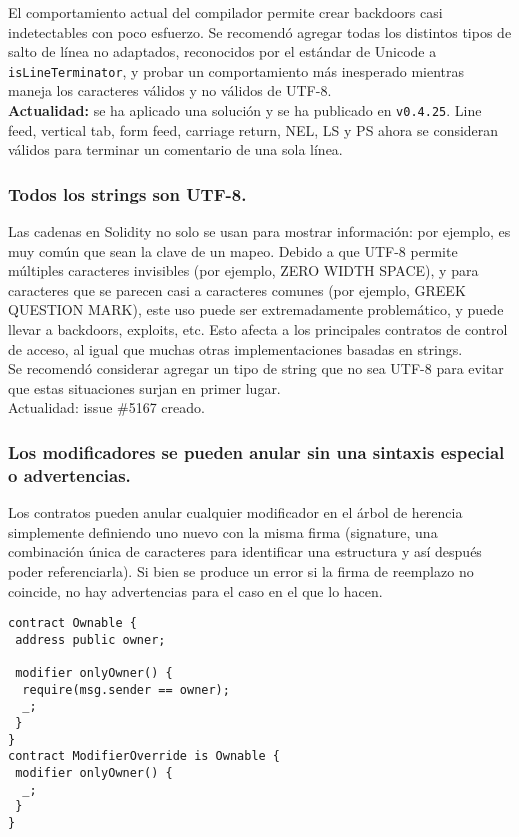 El comportamiento actual del compilador permite crear backdoors casi indetectables con poco esfuerzo. Se recomendó agregar todas los distintos tipos de salto de línea no adaptados, reconocidos por el estándar de Unicode\cite{UnicodeLineBreaking} a \verb|isLineTerminator|, y probar un comportamiento más inesperado mientras maneja los caracteres válidos y no válidos de UTF-8.\\

\textbf{Actualidad:} se ha aplicado una solución\cite{GHPR} y se ha publicado en \verb|v0.4.25|. Line feed, vertical tab, form feed, carriage return, NEL, LS y PS ahora se consideran válidos para terminar un comentario de una sola línea.


\subsubsection{Todos los strings son UTF-8.}
Las cadenas en Solidity no solo se usan para mostrar información: por ejemplo, es muy común que sean la clave de un mapeo. Debido a que UTF-8 permite múltiples caracteres invisibles (por ejemplo, ZERO WIDTH SPACE), y para caracteres que se parecen casi a caracteres comunes (por ejemplo, GREEK QUESTION MARK), este uso puede ser extremadamente problemático, y puede llevar a backdoors, exploits, etc. Esto afecta a los principales contratos de control de acceso, al igual que muchas otras implementaciones basadas en strings.\\

Se recomendó considerar agregar un tipo de string que no sea UTF-8 para evitar que estas situaciones surjan en primer lugar.\\

Actualidad: issue \#5167 creado.

\subsubsection{Los modificadores se pueden anular sin una sintaxis especial o advertencias.}

Los contratos pueden anular cualquier modificador en el árbol de herencia simplemente definiendo uno nuevo con la misma firma (signature, una combinación única de caracteres para identificar una estructura y así después poder referenciarla). Si bien se produce un error si la firma de reemplazo no coincide, no hay advertencias para el caso en el que lo hacen.

\begin{lstlisting}[language=Solidity]
contract Ownable {
 address public owner;
  
 modifier onlyOwner() {
  require(msg.sender == owner);
  _;
 }
}
contract ModifierOverride is Ownable { 
 modifier onlyOwner() {
  _;
 }
}
\end{lstlisting}

